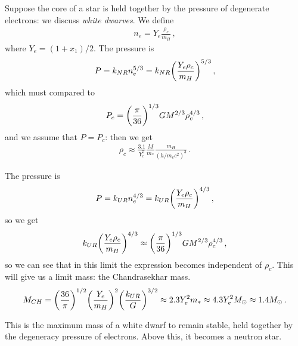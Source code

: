 \documentclass[main.tex]{subfiles}
\begin{document}
Suppose the core of a star is held together by the pressure of degenerate electrons: we discuss \emph{white dwarves}.
We define 
%
\begin{align}
  n_e = Y_{e} \frac{\rho_{c}}{m_H}
\,,
\end{align}
%
where \(Y_e = (1 + x_1) /2\).
The pressure is 
%
\begin{align}
  P = k_{NR} n_e^{5/3} = k_{NR} \qty(\frac{Y_e \rho_{c}}{m_H})^{5/3}
\,,
\end{align}
%
which must compared to 
%
\begin{align}
  P_c = \qty(\frac{\pi }{36})^{1/3} G M^{2/3} \rho_{c}^{4/3}
\,,
\end{align}
%
and we assume that \(P = P_c\): then we get 
%
\begin{align}
  \rho_{c} \approx \frac{\num{3.1}}{Y_e^{5}} \frac{M}{m_{*}} \frac{m_H}{(h / m_e c^2)^{3}}
\,.
\end{align}


The pressure is 
%
\begin{align}
P = k_{UR} n_e^{4/3} 
= k_{UR}\qty(\frac{Y_e \rho_{c}}{m_H})^{4/3}
\,,
\end{align}
%
so we get 
%
\begin{align}
  k_{UR} \qty(\frac{Y_e \rho_{c}}{m_H})^{4/3} \approx 
  \qty(\frac{\pi }{36})^{1/3} G M^{2/3} \rho_{c}^{4/3}
\,,
\end{align}
%
so we can see that in this limit the expression becomes independent of \(\rho_{c}\). This will give us a limit mass: the Chandrasekhar mass.  
%
\begin{align}
  M_{CH} = 
  \qty(\frac{36}{\pi } )^{1/2} \qty(\frac{Y_e}{m_H})^2
  \qty(\frac{k_{UR}}{G})^{3/2} \approx 2.3 Y_e^2 m_{*} \approx 4.3 Y_e^2 M_{\odot} \approx 1.4 M_{\odot}
\,.
\end{align}

This is the maximum mass of a white dwarf to remain stable, held together by the degeneracy pressure of electrons. 
Above this, it becomes a neutron star.
\end{document}
